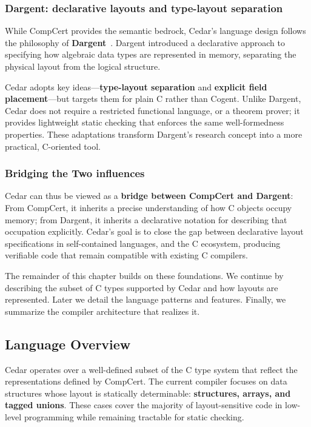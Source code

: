 \subsubsection{Dargent: declarative layouts and type-layout separation}
While CompCert provides the semantic bedrock, Cedar's language design
follows the philosophy of \textbf{Dargent}~\autocite{dargent}.
Dargent introduced a declarative approach to specifying how algebraic data types
are represented in memory, separating the physical layout from the logical
structure.

Cedar adopts key ideas—\textbf{type-layout separation} and \textbf{explicit
field placement}—but targets them for plain C rather than Cogent. Unlike Dargent,
Cedar does not require a restricted functional language, or a theorem prover;
it provides lightweight static checking that enforces the same
well-formedness properties. These adaptations transform Dargent's research
concept into a more practical, C-oriented tool.

\subsubsection{Bridging the Two influences}
Cedar can thus be viewed as a \textbf{bridge between CompCert and Dargent}:
From CompCert, it inherits a precise understanding of how C objects
occupy memory; from Dargent, it inherits a declarative notation for describing
that occupation explicitly.
Cedar's goal is to close the gap between declarative layout specifications
in self-contained languages, and the C ecosystem, producing verifiable code
that remain compatible with existing C compilers.

The remainder of this chapter builds on these foundations.
We continue by describing the subset of C types supported by Cedar and how
layouts are represented. Later we detail the language patterns and features.
Finally, we summarize the compiler architecture that realizes it.

\subsection{Language Overview}
Cedar operates over a well-defined subset of the C type system that
reflect the representations defined by CompCert. The
current compiler focuses on data structures whose layout is
statically determinable: \textbf{structures, arrays, and
tagged unions}. These cases cover the majority of layout-sensitive
code in low-level programming while remaining tractable for static
checking.


